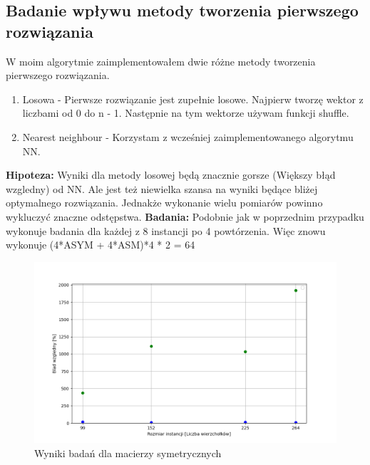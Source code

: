 \documentclass{article}
\begin{document}
      \subsection{Badanie wpływu metody tworzenia pierwszego rozwiązania}
        W moim algorytmie zaimplementowałem dwie różne metody tworzenia pierwszego rozwiązania.
        \begin{enumerate}
          \item Losowa - Pierwsze rozwiązanie jest zupełnie losowe. Najpierw tworzę wektor z liczbami
          od 0 do n - 1. Następnie na tym wektorze używam funkcji shuffle. 
          \item Nearest neighbour - Korzystam z wcześniej zaimplementowanego algorytmu NN. 
        \end{enumerate}
        \textbf{Hipoteza: } Wyniki dla metody losowej będą znacznie gorsze (Większy błąd wzgledny) od NN.
        Ale jest też niewielka szansa na wyniki będące bliżej optymalnego rozwiązania. Jednakże wykonanie
        wielu pomiarów powinno wykluczyć znaczne odstępstwa.\linebreak
        \textbf{Badania: } Podobnie jak w poprzednim przypadku wykonuje badania dla każdej z 8 instancji
        po 4 powtórzenia. Więc znowu wykonuje (4*ASYM + 4*ASM)*4 * 2 = 64\linebreak
        \FloatBarrier
        
        \FloatBarrier
        \begin{figure}[ht]
          \centering
          \includegraphics[width=\textwidth]{src/plots/symTsStartVal.png}
          \caption{Wyniki badań dla macierzy symetrycznych}
          \label{fig:symStartVal}
        \end{figure}
\end{document}
